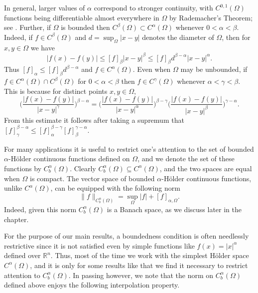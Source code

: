 \documentclass[oneside,hidelinks,indentfirst,10pt]{book}
\begin{document}
In general, larger values of \(\alpha\) correspond to stronger continuity, with \(C^{0,1}(\Omega)\) functions being differentiable almost everywhere in \(\Omega\) by Rademacher's Theorem; see . Further, if \(\Omega\) is bounded then \(C^{\beta}(\Omega)\subset C^{\alpha}(\Omega)\) whenever \(0<\alpha<\beta\). Indeed, if \(f\in C^{\beta}(\Omega)\) and \(d=\sup_{\Omega}|x-y|\) denotes the diameter of \(\Omega\), then for \(x,y\in\Omega\) we have
\[
    |f(x)-f(y)|\leq [f]_\beta|x-y|^\beta\leq [f]_\beta d^{\beta-\alpha}|x-y|^{\alpha}.
\]
Thus \([f]_\alpha\leq[f]_\beta d^{\beta-\alpha}\) and \(f\in C^\alpha(\Omega)\). Even when \(\Omega\) may be unbounded, if \(f\in C^{\alpha}(\Omega)\cap C^{\beta}(\Omega)\) for \(0<\alpha<\beta\) then \(f\in C^{\gamma}(\Omega)\) whenever \(\alpha<\gamma<\beta\). This is because for distinct points \(x,y\in\Omega\),
\begin{equation}\label{eq:sninterp}
    \bigg(\frac{|f(x)-f(y)|}{|x-y|^\gamma}\bigg)^{\beta-\alpha}=\bigg(\frac{|f(x)-f(y)|}{|x-y|^\alpha}\bigg)^{\beta-\gamma}\bigg(\frac{|f(x)-f(y)|}{|x-y|^\beta}\bigg)^{\gamma-\alpha}.
\end{equation}
From this estimate it follows after taking a supremum that \([f]_\gamma^{\beta-\alpha}\leq [f]_\alpha^{\beta-\gamma}[f]_\beta^{\gamma-\alpha}\). 


For many applications it is useful to restrict one's attention to the set of bounded \(\alpha\)-H\"older continuous functions defined on \(\Omega\), and we denote the set of these functions by \(C^\alpha_b(\Omega)\). Clearly \(C^\alpha_b(\Omega)\subseteq C^\alpha(\Omega)\), and the two spaces are equal when \(\Omega\) is compact. The vector space of bounded \(\alpha\)-H\"older continuous functions, unlike \(C^\alpha(\Omega)\), can be equipped with the following norm
\[
    \|f\|_{C_b^{\alpha}(\Omega)}=\sup_\Omega|f|+[f]_{\alpha,\Omega}.
\]
Indeed, given this norm \(C_b^{\alpha}(\Omega)\) is a Banach space, as we discuss later in the chapter. 

For the purpose of our main results, a boundedness condition is often needlessly restrictive since it is not satisfied even by simple functions like \(f(x)=|x|^\alpha\) defined over \(\mathbb{R}^n\). Thus, most of the time we work with the simplest H\"older space \(C^\alpha(\Omega)\), and it is only for some results like  that we find it necessary to restrict attention to \(C^\alpha_b(\Omega)\). In passing however, we note that the norm on \(C^\alpha_b(\Omega)\) defined above enjoys the following interpolation property.
\end{document}
